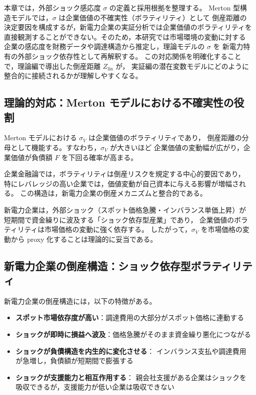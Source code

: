 本章では，外部ショック感応度 $\sigma$ の定義と採用根拠を整理する。
Merton 型構造モデルでは，$\sigma$ は企業価値の不確実性（ボラティリティ）として
倒産距離の決定要因を構成するが，新電力企業の実証分析では企業価値のボラティリティを
直接観測することができない。そのため，本研究では市場環境の変動に対する
企業の感応度を財務データや調達構造から推定し，理論モデルの $\sigma$ を
新電力特有の外部ショック依存性として再解釈する。
この対応関係を明確化することで，理論編で導出した倒産距離 $Z_{\text{lin}}$ が，
実証編の潜在変数モデルにどのように整合的に接続されるかが理解しやすくなる。

\subsection{理論的対応：Merton モデルにおける不確実性の役割}

Merton モデルにおける $\sigma_V$ は企業価値のボラティリティであり，
倒産距離の分母として機能する。すなわち，$\sigma_V$ が大きいほど
企業価値の変動幅が広がり，企業価値が負債額 $F$ を下回る確率が高まる。

企業金融論では，ボラティリティは倒産リスクを規定する中心的要因であり，
特にレバレッジの高い企業では，価値変動が自己資本に与える影響が増幅される。
この構造は，新電力企業の倒産メカニズムと整合的である。

新電力企業は，外部ショック（スポット価格急騰・インバランス単価上昇）が
短期間で資金繰りに波及する「ショック依存型産業」であり，
企業価値のボラティリティは市場価格の変動に強く依存する。
したがって，$\sigma_V$ を市場価格の変動から proxy 化することは理論的に妥当である。

\subsection{新電力企業の倒産構造：ショック依存型ボラティリティ}

新電力企業の倒産構造には，以下の特徴がある。

\begin{itemize}
    \item \textbf{スポット市場依存度が高い}：調達費用の大部分がスポット価格に連動する
    \item \textbf{ショックが即時に損益へ波及}：価格急騰がそのまま資金繰り悪化につながる
    \item \textbf{ショックが負債構造を内生的に変化させる}：
          インバランス支払や調達費用が急増し，負債額が短期間で膨張する
    \item \textbf{ショックが支援能力と相互作用する}：
          親会社支援がある企業はショックを吸収できるが，支援能力が低い企業は吸収できない
\end{itemize}


